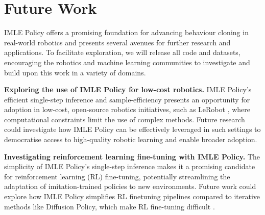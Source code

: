 



\section{Future Work}

IMLE Policy offers a promising foundation for advancing behaviour cloning in real-world robotics and presents several avenues for further research and applications. To facilitate exploration, we will release all code and datasets, encouraging the robotics and machine learning communities to investigate and build upon this work in a variety of domains.

\textbf{Exploring the use of IMLE Policy for low-cost robotics.} IMLE Policy’s efficient single-step inference and sample-efficiency presents an opportunity for adoption in low-cost, open-source robotics initiatives, such as LeRobot \cite{cadene2024lerobot}, where computational constraints limit the use of complex methods. Future research could investigate how IMLE Policy can be effectively leveraged in such settings to democratise access to high-quality robotic learning and enable broader adoption.

\textbf{Investigating reinforcement learning fine-tuning with IMLE Policy.} The simplicity of IMLE Policy's single-step inference makes it a promising candidate for reinforcement learning (RL) fine-tuning, potentially streamlining the adaptation of imitation-trained policies to new environments. Future work could explore how IMLE Policy simplifies RL finetuning pipelines compared to iterative methods like Diffusion Policy, which make RL fine-tuning difficult \cite{dppo}.

